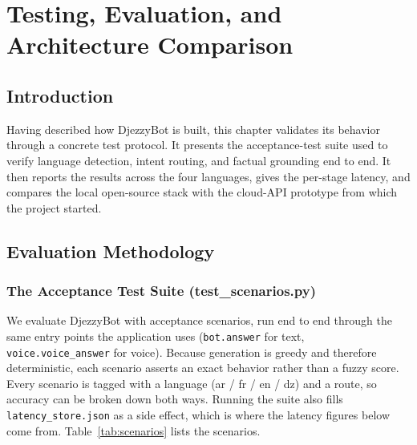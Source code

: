 \documentclass[12pt, a4paper]{report}
\newcommand{\humantext}[1]{#1}      %
\begin{document}
\chapter{Testing, Evaluation, and Architecture Comparison}

\section{Introduction}
\humantext{Having described how DjezzyBot is built, this chapter validates its behavior through a concrete test protocol.} \humantext{It presents the acceptance-test suite used to verify language detection, intent routing, and factual grounding end to end. It then reports the results across the four languages, gives the per-stage latency, and compares the local open-source stack with the cloud-API prototype from which the project started.}

\section{Evaluation Methodology}

\subsection{The Acceptance Test Suite (test\_scenarios.py)}
\humantext{We evaluate DjezzyBot with \numTestsTotal{} acceptance scenarios, run end to end through the same entry points the application uses (\texttt{bot.answer} for text, \texttt{voice.voice\_answer} for voice). Because generation is greedy and therefore deterministic, each scenario asserts an exact behavior rather than a fuzzy score. Every scenario is tagged with a language (ar / fr / en / dz) and a route, so accuracy can be broken down both ways. Running the suite also fills \texttt{latency\_store.json} as a side effect, which is where the latency figures below come from. Table~\ref{tab:scenarios} lists the scenarios.}
\end{document}
